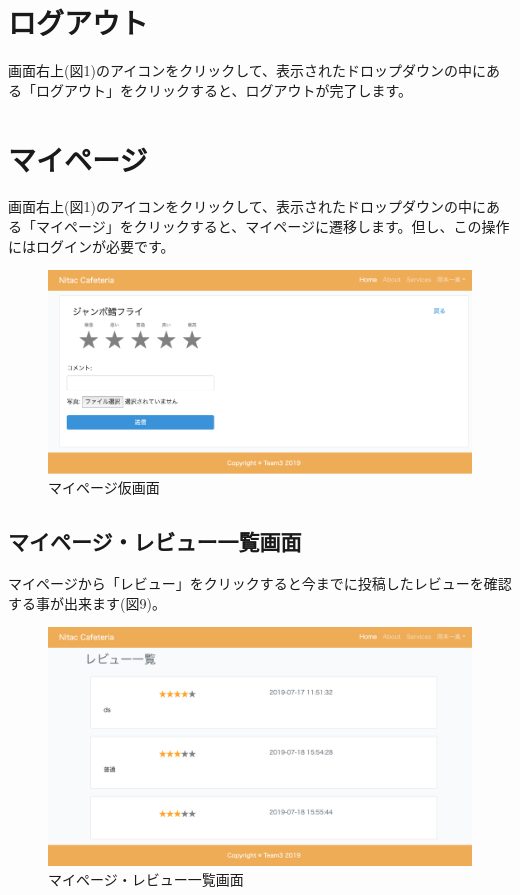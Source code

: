 \documentclass[a4paper]{ltjsarticle}
\begin{document}
\section{ログアウト}
    画面右上(図1)のアイコンをクリックして、表示されたドロップダウンの中にある「ログアウト」をクリックすると、ログアウトが完了します。

\section{マイページ}
    画面右上(図1)のアイコンをクリックして、表示されたドロップダウンの中にある「マイページ」をクリックすると、マイページに遷移します。但し、この操作にはログインが必要です。
    \begin{figure}[htbp]
    \centering
        \caption{マイページ仮画面}
        \includegraphics[scale = 0.3]{image/review2.png}
    \end{figure}
    \newpage

    \subsection{マイページ・レビュー一覧画面}
        マイページから「レビュー」をクリックすると今までに投稿したレビューを確認する事が出来ます(図9)。
        \begin{figure}[htbp]
        \centering
            \caption{マイページ・レビュー一覧画面}
            \includegraphics[scale = 0.3]{image/myreview.png}
        \end{figure}
\end{document}
